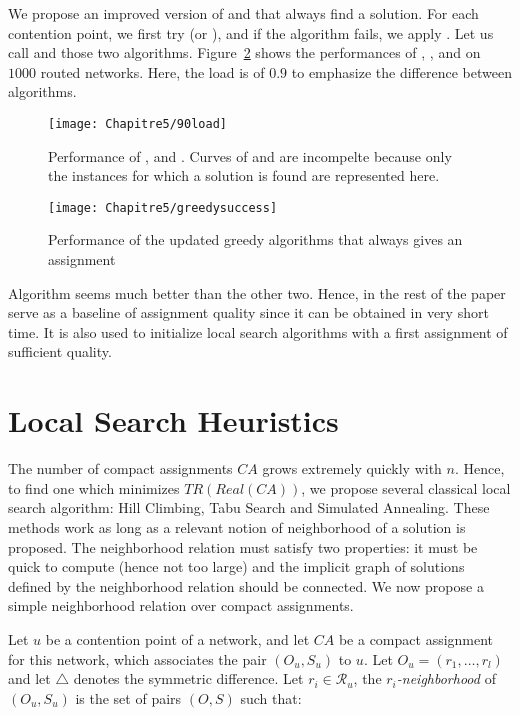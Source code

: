 We propose an improved version of \greedydeadline and \greedynormalized that always find a solution. For each contention point, we first try \greedydeadline (or \greedynormalized), and if the algorithm fails, we apply \greedypacked. Let us call \hybridgreedydeadline and \hybridgreedynormalized those two algorithms. Figure~\ref{fig:greedysuccess} shows the performances of \hybridgreedydeadline, \hybridgreedynormalized, and \greedypacked on $1000$ routed networks. Here, the load is of $0.9$ to emphasize the difference between algorithms.

 	\begin{figure}
	\centering
	\texttt{[image: Chapitre5/90load]}
\caption{Performance of \greedydeadline, \greedynormalized and \greedypacked. Curves of \greedydeadline and \greedynormalized are incompelte because only the instances for which a solution is found are represented here.}
\label{fig:90load}
\end{figure}


\begin{figure}
	\centering
	\texttt{[image: Chapitre5/greedysuccess]}
\caption{Performance of the updated greedy algorithms that always gives an assignment} 
\label{fig:greedysuccess}
\end{figure}

Algorithm \hybridgreedynormalized seems much better than the other two. Hence, in the rest of the paper \hybridgreedynormalized serve as a baseline of assignment quality since it can be obtained in very short time. It is also used to initialize local search algorithms with a first assignment of sufficient quality.

\section{Local Search Heuristics}

The number of compact assignments $CA$ grows extremely quickly with $n$. Hence, to find one which minimizes $TR(Real(CA))$, we propose several classical local search algorithm: Hill Climbing, Tabu Search and Simulated Annealing. These methods work as long as a relevant notion of neighborhood of a solution is proposed. The neighborhood relation must satisfy two properties: it must be quick to compute (hence not too large) and the implicit graph of solutions defined
by the neighborhood relation should be connected. We now propose a simple neighborhood relation over compact assignments.

Let $u$ be a contention point of a network, and let $CA$ be a compact assignment for this network, 
 which associates the pair $(O_u,S_u)$ to $u$. Let $O_u = (r_1,\dots,r_l)$ and let $\triangle$ denotes the symmetric difference.   Let $r_i \in \mathcal{R}_u$, the \emph{$r_i$-neighborhood} of $(O_u,S_u)$ is the set of pairs $(O,S)$ such that:
 
